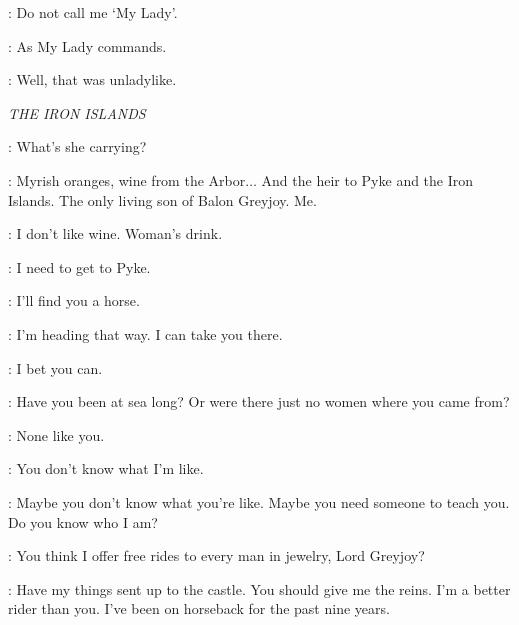 \ARYA: Do not call me `My Lady'.

\GENDRY: As My Lady commands.


\GENDRY: Well, that was unladylike.



\scene

\newpage

\textit{THE IRON ISLANDS}


\OLDMAN: What's she carrying?

\THEON: Myrish oranges, wine from the Arbor$\ldots$ And the heir to Pyke and the Iron Islands.  The only living son of Balon Greyjoy.  Me.

\OLDMAN: I don't like wine. Woman's drink.

\THEON: I need to get to Pyke.


\OLDMAN: I'll find you a horse.


\YARA: I'm heading that way. I can take you there.

\THEON: I bet you can.

\YARA: Have you been at sea long? Or were there just no women where you came from?

\THEON: None like you.

\YARA: You don't know what I'm like.

\THEON: Maybe you don't know what you're like. Maybe you need someone to teach you. Do you know who I am?

\YARA: You think I offer free rides to every man in jewelry, Lord Greyjoy?


\THEON: Have my things sent up to the castle.  You should give me the reins. I'm a better rider than you. I've been on horseback for the past nine years.

